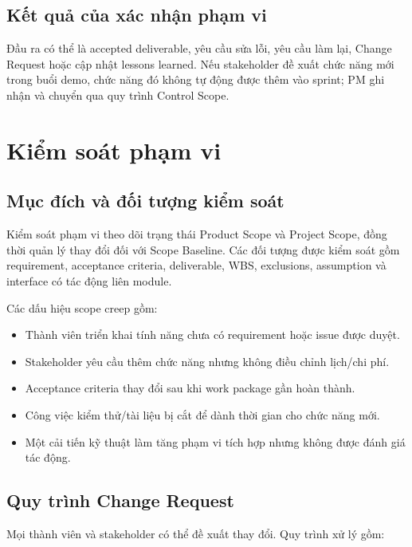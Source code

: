 \subsection{Kết quả của xác nhận phạm vi}

Đầu ra có thể là accepted deliverable, yêu cầu sửa lỗi, yêu cầu làm lại, Change Request hoặc cập nhật lessons learned. Nếu stakeholder đề xuất chức năng mới trong buổi demo, chức năng đó không tự động được thêm vào sprint; PM ghi nhận và chuyển qua quy trình Control Scope.

\fi
\section{Kiểm soát phạm vi}

\subsection{Mục đích và đối tượng kiểm soát}

Kiểm soát phạm vi theo dõi trạng thái Product Scope và Project Scope, đồng thời quản lý thay đổi đối với Scope Baseline. Các đối tượng được kiểm soát gồm requirement, acceptance criteria, deliverable, WBS, exclusions, assumption và interface có tác động liên module.

Các dấu hiệu scope creep gồm:

\begin{itemize}
  \item Thành viên triển khai tính năng chưa có requirement hoặc issue được duyệt.
  \item Stakeholder yêu cầu thêm chức năng nhưng không điều chỉnh lịch/chi phí.
  \item Acceptance criteria thay đổi sau khi work package gần hoàn thành.
  \item Công việc kiểm thử/tài liệu bị cắt để dành thời gian cho chức năng mới.
  \item Một cải tiến kỹ thuật làm tăng phạm vi tích hợp nhưng không được đánh giá tác động.
\end{itemize}

\subsection{Quy trình Change Request}

Mọi thành viên và stakeholder có thể đề xuất thay đổi. Quy trình xử lý gồm:

